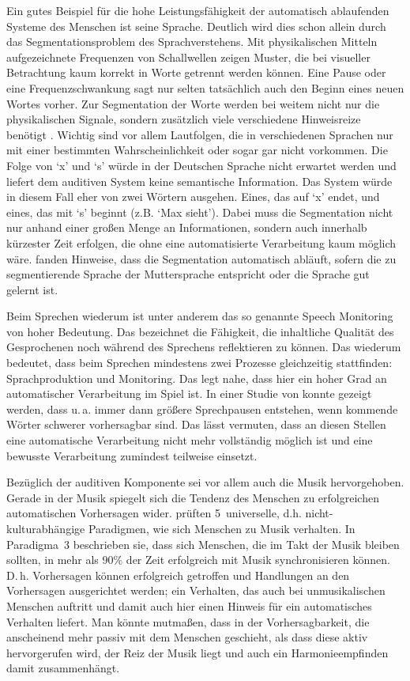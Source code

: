 \documentclass[doc,a4paper,12pt]{apa6}
\begin{document}
Ein gutes Beispiel für die hohe Leistungsfähigkeit der automatisch ablaufenden Systeme des Menschen ist seine Sprache. Deutlich wird dies schon allein durch das Segmentationsproblem des Sprachverstehens. Mit physikalischen Mitteln aufgezeichnete Frequenzen von Schallwellen zeigen Muster, die bei visueller Betrachtung kaum korrekt in Worte getrennt werden können. Eine Pause oder eine Frequenzschwankung sagt nur selten tatsächlich auch den Beginn eines neuen Wortes vorher. Zur Segmentation der Worte werden bei weitem nicht nur die physikalischen Signale, sondern zusätzlich viele verschiedene Hinweisreize benötigt \parencites[u.\,a.][]{brent1996distributional}{saffran1996word}. Wichtig sind vor allem Lautfolgen, die in verschiedenen Sprachen nur mit einer bestimmten Wahrscheinlichkeit oder sogar gar nicht vorkommen. Die Folge von `x' und `s' würde in der Deutschen Sprache nicht erwartet werden und liefert dem auditiven System keine semantische Information. Das System würde in diesem Fall eher von zwei Wörtern ausgehen. Eines, das auf `x' endet, und eines, das mit `s' beginnt (z.B. `Max sieht'). Dabei muss die Segmentation nicht nur anhand einer großen Menge an Informationen, sondern auch innerhalb kürzester Zeit erfolgen, die ohne eine automatisierte Verarbeitung kaum möglich wäre. \textcite{sanders2002segmenting} fanden Hinweise, dass die Segmentation automatisch abläuft, sofern die zu segmentierende Sprache der Muttersprache entspricht oder die Sprache gut gelernt ist.

Beim Sprechen wiederum ist unter anderem das so genannte Speech Monitoring \parencites{levelt1983monitoring}{postma2000detection} von hoher Bedeutung. Das bezeichnet die Fähigkeit, die inhaltliche Qualität des Gesprochenen noch während des Sprechens reflektieren zu können. Das wiederum bedeutet, dass beim Sprechen mindestens zwei Prozesse gleichzeitig stattfinden: Sprachproduktion und Monitoring. Das legt nahe, dass hier ein hoher Grad an automatischer Verarbeitung im Spiel ist. In einer Studie von \textcite{goldman1958speech} konnte gezeigt werden, dass u.\,a. immer dann größere Sprechpausen entstehen, wenn kommende Wörter schwerer vorhersagbar sind. Das lässt vermuten, dass an diesen Stellen eine automatische Verarbeitung nicht mehr vollständig möglich ist und eine bewusste Verarbeitung zumindest teilweise einsetzt.

Bezüglich der auditiven Komponente sei vor allem auch die Musik hervorgehoben. Gerade in der Musik spiegelt sich die Tendenz des Menschen zu erfolgreichen automatischen Vorhersagen wider. \textcite{drake2001quest} prüften 5~universelle, d.h. nicht-kulturabhängige Paradigmen, wie sich Menschen zu Musik verhalten. In Paradigma~3 beschrieben sie, dass sich Menschen, die im Takt der Musik bleiben sollten, in mehr als 90\% der Zeit erfolgreich mit Musik synchronisieren können. D.\,h. Vorhersagen können erfolgreich getroffen und Handlungen an den Vorhersagen ausgerichtet werden; ein Verhalten, das auch bei unmusikalischen Menschen auftritt und damit auch hier einen Hinweis für ein automatisches Verhalten liefert. Man könnte mutmaßen, dass in der Vorhersagbarkeit, die anscheinend mehr passiv mit dem Menschen geschieht, als dass diese aktiv hervorgerufen wird, der Reiz der Musik liegt und auch ein Harmonieempfinden damit zusammenhängt.
\end{document}
